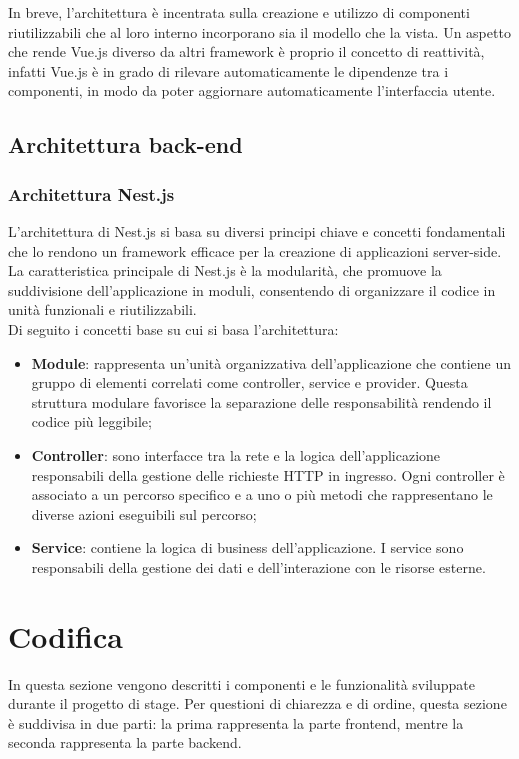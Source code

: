 In breve, l'architettura è incentrata sulla creazione e utilizzo di componenti riutilizzabili che al loro interno incorporano sia il modello che la vista. Un aspetto che rende Vue.js
diverso da altri framework è proprio il concetto di reattività, infatti Vue.js è in grado di rilevare automaticamente le dipendenze tra i componenti, in modo da poter aggiornare automaticamente l'interfaccia utente.

\subsection{Architettura back-end}\label{subsec:architettura-backend}
\subsubsection{Architettura Nest.js}\label{subsubsec:architettura-nest.js}
L'architettura di Nest.js si basa su diversi principi chiave e concetti fondamentali che lo rendono un framework efficace per la creazione di applicazioni server-side.
La caratteristica principale di Nest.js è la modularità, che promuove la suddivisione dell'applicazione in moduli, consentendo di organizzare il codice in unità funzionali e riutilizzabili.\\
Di seguito i concetti base su cui si basa l'architettura:
\begin{itemize}
  \item \textbf{Module}: rappresenta un'unità organizzativa dell'applicazione che contiene un gruppo di elementi correlati come controller, service e provider. Questa struttura modulare 
  favorisce la separazione delle responsabilità rendendo il codice più leggibile;
  \item \textbf{Controller}: sono interfacce tra la rete e la logica dell'applicazione responsabili della gestione delle richieste HTTP in ingresso. Ogni controller è associato a un percorso specifico e a uno o più metodi che rappresentano le diverse azioni eseguibili sul percorso;
  \item \textbf{Service}: contiene la logica di business dell'applicazione. I service sono responsabili della gestione dei dati e dell'interazione con le risorse esterne.
\end{itemize}


\section{Codifica}
In questa sezione vengono descritti i componenti e le funzionalità sviluppate durante il progetto di stage. 
Per questioni di chiarezza e di ordine, questa sezione è suddivisa in due parti: la prima rappresenta la parte frontend, mentre la seconda rappresenta la parte backend.
